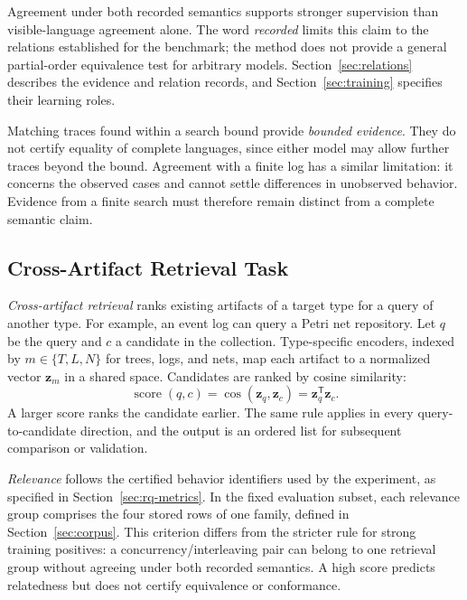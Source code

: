 \documentclass[mathematics,article,submit,moreauthors]{Definitions/mdpi}
\newcommand{\vect}[1]{\boldsymbol{#1}}
\begin{document}
Agreement under both recorded semantics supports stronger supervision than visible-language agreement alone. The word \emph{recorded} limits this claim to the relations established for the benchmark; the method does not provide a general partial-order equivalence test for arbitrary models. Section~\ref{sec:relations} describes the evidence and relation records, and Section~\ref{sec:training} specifies their learning roles.

Matching traces found within a search bound provide \emph{bounded evidence}. They do not certify equality of complete languages, since either model may allow further traces beyond the bound. Agreement with a finite log has a similar limitation: it concerns the observed cases and cannot settle differences in unobserved behavior. Evidence from a finite search must therefore remain distinct from a complete semantic claim.

\subsection{Cross-Artifact Retrieval Task}

\emph{Cross-artifact retrieval} ranks existing artifacts of a target type for a query of another type. For example, an event log can query a Petri net repository. Let $q$ be the query and $c$ a candidate in the collection. Type-specific encoders, indexed by $m\in\{T,L,N\}$ for trees, logs, and nets, map each artifact to a normalized vector $\vect z_m$ in a shared space. Candidates are ranked by cosine similarity:
\begin{equation}
\operatorname{score}(q,c)
=\cos(\vect z_q,\vect z_c)
=\vect z_q^{\mathsf T}\vect z_c.
\label{eq:retrieval-score}
\end{equation}
A larger score ranks the candidate earlier. The same rule applies in every query-to-candidate direction, and the output is an ordered list for subsequent comparison or validation.

\emph{Relevance} follows the certified behavior identifiers used by the experiment, as specified in Section~\ref{sec:rq-metrics}. In the fixed evaluation subset, each relevance group comprises the four stored rows of one family, defined in Section~\ref{sec:corpus}. This criterion differs from the stricter rule for strong training positives: a concurrency/interleaving pair can belong to one retrieval group without agreeing under both recorded semantics. A high score predicts relatedness but does not certify equivalence or conformance.
\end{document}
